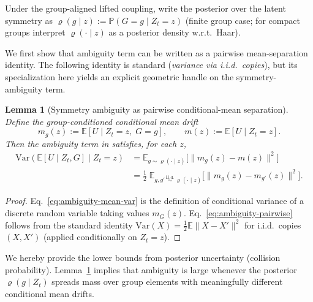 \documentclass{article}
\theoremstyle{plain}
\newtheorem{lemma}[theorem]{Lemma}
\theoremstyle{definition}
\theoremstyle{remark}
\newcommand{\1}{\mathbf{1}}
\begin{document}
Under the group-aligned lifted coupling, write the posterior over the latent symmetry as $\varrho(g\mid z):=\mathbb{P}(G=g\mid Z_t=z)$ (finite group case;
for compact groups interpret $\varrho(\cdot\mid z)$ as a posterior density w.r.t.\ Haar).

We first show that ambiguity term can be written as a pairwise mean-separation identity.
The following identity is standard (\emph{variance via i.i.d.\ copies}), but its specialization here yields an explicit
geometric handle on the symmetry-ambiguity term.

\begin{lemma}[Symmetry ambiguity as pairwise conditional-mean separation]
\label{lem:ambiguity-pairwise}
Define the group-conditioned conditional mean drift
\begin{equation}
m_g(z) := \mathbb{E}[U\mid Z_t=z,\;G=g],
\qquad
m(z) := \mathbb{E}[U\mid Z_t=z].
\end{equation}
Then the ambiguity term in  satisfies, for each $z$,
\begin{align}
\mathrm{Var}\!\left(\mathbb{E}[U\mid Z_t,G]\mid Z_t=z\right)
&= \mathbb{E}_{g\sim \varrho(\cdot\mid z)}\big[\|m_g(z)-m(z)\|^2\big] \label{eq:ambiguity-mean-var}\\
&= \frac{1}{2}\;\mathbb{E}_{g,g'\,\overset{\text{i.i.d.}}{\sim}\, \varrho(\cdot\mid z)}\big[\|m_g(z)-m_{g'}(z)\|^2\big]. \label{eq:ambiguity-pairwise}
\end{align}
\end{lemma}

\begin{proof}
Eq.~\eqref{eq:ambiguity-mean-var} is the definition of conditional variance of a discrete random variable taking values
$m_G(z)$. Eq.~\eqref{eq:ambiguity-pairwise} follows from the standard identity
$\mathrm{Var}(X)=\frac{1}{2}\mathbb{E}\|X-X'\|^2$ for i.i.d.\ copies $(X,X')$ (applied conditionally on $Z_t=z$).
\end{proof}

We hereby provide the lower bounds from posterior uncertainty (collision probability).
Lemma~\ref{lem:ambiguity-pairwise} implies that ambiguity is large whenever the posterior $\varrho(g\mid Z_t)$ spreads mass
over group elements with meaningfully different conditional mean drifts.
\end{document}
